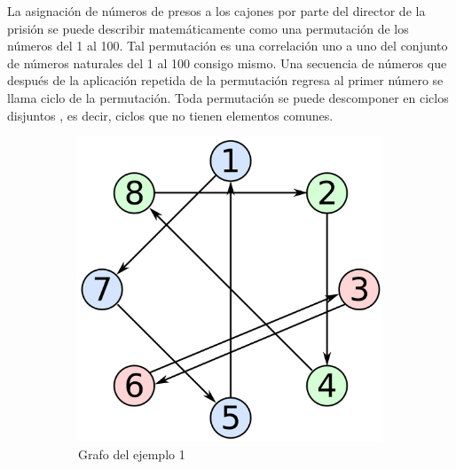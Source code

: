 La asignación de números de presos a los cajones por parte del director de la prisión se puede describir matemáticamente como una permutación de los números del 1 al 100. Tal permutación es una correlación uno a uno del conjunto de números naturales del 1 al 100 consigo mismo. Una secuencia de números que después de la aplicación repetida de la permutación regresa al primer número se llama ciclo de la permutación. Toda permutación se puede descomponer en ciclos disjuntos , es decir, ciclos que no tienen elementos comunes. 
\begin{figure}[H]
\begin{subfigure}{0.49\textwidth}
     \includegraphics[width=\textwidth]{imagenes/Permutation_cycles_qtl1.png}
     \caption{Grafo del ejemplo 1}
     \label{fig:grafo_primer_ejemplo}
 \end{subfigure}
 \hfill
 \begin{subfigure}{0.49\textwidth}

\end{subfigure}
\end{figure}

